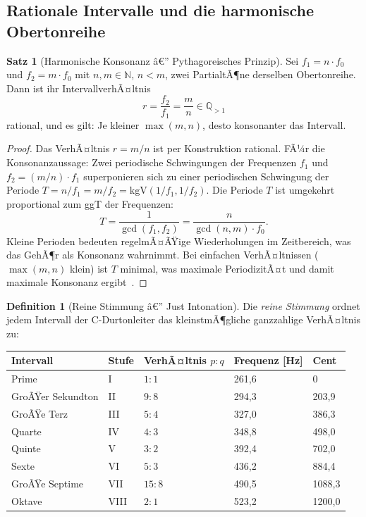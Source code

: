 ﻿\documentclass[a4paper,12pt]{article}
\theoremstyle{definition}
\newtheorem{definition}{Definition}
\newtheorem{satz}{Satz}
\begin{document}
\subsection{Rationale Intervalle und die harmonische Obertonreihe}

\begin{satz}[Harmonische Konsonanz â€” Pythagoreisches Prinzip]
\label{satz:pythagoras}
Sei $f_1 = n \cdot f_0$ und $f_2 = m \cdot f_0$ mit $n, m \in \mathbb{N}$, $n < m$,
zwei PartialtÃ¶ne derselben Obertonreihe. Dann ist ihr IntervallverhÃ¤ltnis
\[
r = \frac{f_2}{f_1} = \frac{m}{n} \in \mathbb{Q}_{>1}
\]
rational, und es gilt: Je kleiner $\max(m, n)$, desto konsonanter das Intervall.
\end{satz}

\begin{proof}
Das VerhÃ¤ltnis $r = m/n$ ist per Konstruktion rational. FÃ¼r die Konsonanzaussage:
Zwei periodische Schwingungen der Frequenzen $f_1$ und $f_2 = (m/n) \cdot f_1$
superponieren sich zu einer periodischen Schwingung der Periode
$T = n/f_1 = m/f_2 = \text{kgV}(1/f_1, 1/f_2)$.
Die Periode $T$ ist umgekehrt proportional zum ggT der Frequenzen:
\[
T = \frac{1}{\gcd(f_1, f_2)} = \frac{n}{\gcd(n,m) \cdot f_0}.
\]
Kleine Perioden bedeuten regelmÃ¤ÃŸige Wiederholungen im Zeitbereich, was das
GehÃ¶r als Konsonanz wahrnimmt. Bei einfachen VerhÃ¤ltnissen ($\max(m,n)$ klein) ist
$T$ minimal, was maximale PeriodizitÃ¤t und damit maximale Konsonanz ergibt~\cite{helmholtz1863}.
\end{proof}

\begin{definition}[Reine Stimmung â€” Just Intonation]
Die \emph{reine Stimmung} ordnet jedem Intervall der C-Durtonleiter das
kleinstmÃ¶gliche ganzzahlige VerhÃ¤ltnis zu:
\begin{center}
\begin{tabular}{lllll}
\toprule
Intervall & Stufe & VerhÃ¤ltnis $p:q$ & Frequenz [Hz] & Cent \\
\midrule
Prime     & I   & $1:1$   & 261,6 & 0 \\
GroÃŸer Sekundton & II  & $9:8$   & 294,3 & 203,9 \\
GroÃŸe Terz & III & $5:4$   & 327,0 & 386,3 \\
Quarte    & IV  & $4:3$   & 348,8 & 498,0 \\
Quinte    & V   & $3:2$   & 392,4 & 702,0 \\
Sexte     & VI  & $5:3$   & 436,2 & 884,4 \\
GroÃŸe Septime & VII & $15:8$ & 490,5 & 1088,3 \\
Oktave    & VIII & $2:1$  & 523,2 & 1200,0 \\
\bottomrule
\end{tabular}
\end{center}
\end{definition}
\end{document}
